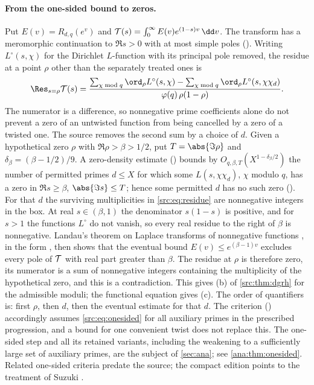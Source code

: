 \paragraph{From the one-sided bound to zeros.}
Put $E(v)=R_{d,q}(e^v)$ and $\srcT(s)=\int_0^\infty E(v)e^{(1-s)v}\,\dd v$. The transform has
a meromorphic continuation to $\Re s>0$ with at most simple poles
(). Writing $L^\circ(s,\chi)$ for the Dirichlet $L$-function
with its principal pole removed, the residue at a point $\rho$ other than the separately
treated ones is
\begin{equation}\label{src:eq:residue}
\Res_{s=\rho}\srcT(s)=
\frac{\sum_{\chi\bmod q}\ord_\rho L^\circ(s,\chi)-\sum_{\chi\bmod q}\ord_\rho L^\circ(s,\chi\chi_d)}
{\varphi(q)\,\rho(1-\rho)} .
\end{equation}
The numerator is a difference, so nonnegative prime coefficients alone do not prevent a zero
of an untwisted function from being cancelled by a zero of a twisted one. The source removes
the second sum by a choice of $d$. Given a hypothetical zero $\rho$ with $\Re\rho>\beta>1/2$,
put $T=\abs{\Im\rho}$ and $\delta_\beta=(\beta-1/2)/9$. A zero-density estimate
() bounds by $O_{q,\beta,T}(X^{1-\delta_\beta/2})$ the number of
permitted primes $d\le X$ for which some $L(s,\chi\chi_d)$, $\chi$ modulo $q$, has a zero in
$\Re s\ge\beta$, $\abs{\Im s}\le T$; hence some permitted $d$ has no such zero
(). For that $d$ the surviving multiplicities in
\eqref{src:eq:residue} are nonnegative integers in the box. At real $s\in(\beta,1)$ the
denominator $s(1-s)$ is positive, and for $s>1$ the functions $L^\circ$ do not vanish, so
every real residue to the right of $\beta$ is nonnegative. Landau's theorem on Laplace
transforms of nonnegative functions \cite[Lemma~15.1]{MontgomeryVaughan2007Multiplicative},
in the form , then shows that the eventual bound
$E(v)\le e^{(\beta-1)v}$ excludes every pole of $\mathcal{T}$ with real part greater than $\beta$.
The residue at $\rho$ is therefore zero, its numerator is a sum of nonnegative integers
containing the multiplicity of the hypothetical zero, and this is a contradiction. This gives
(b) of \cref{src:thm:dgrh} for the admissible moduli; the functional equation gives (c). The
order of quantifiers is: first $\rho$, then $d$, then the eventual estimate for that $d$. The
criterion () accordingly assumes
\eqref{src:eq:onesided} for all auxiliary primes in the prescribed progression, and a bound
for one convenient twist does not replace this. The one-sided step and all its retained
variants, including the weakening to a sufficiently large set of auxiliary primes, are the
subject of \cref{sec:ana}; see \cref{ana:thm:onesided}. Related one-sided criteria predate the
source; the compact edition points to the treatment of Suzuki \cite{Suzuki2025Variants}.

